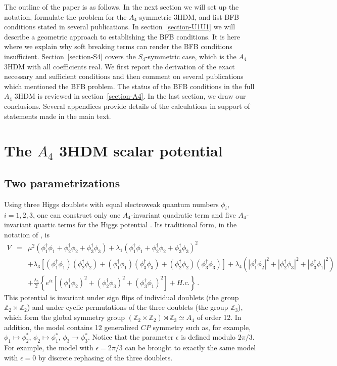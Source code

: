\documentclass[11pt]{article}
\newcommand{\Z}{\mathbb{Z}}
\begin{document}
The outline of the paper is as follows.
In the next section we will set up the notation, formulate the problem for the $A_4$-symmetric 3HDM,
and list BFB conditions stated in several publications.
In section~\ref{section-U1U1} we will describe a geometric approach to establishing the BFB conditions. 
It is here where we explain
why soft breaking terms can render the BFB conditions insufficient.
Section~\ref{section-S4} covers the $S_4$-symmetric case, which is the $A_4$ 3HDM with all coefficients real.
We first report the derivation of the exact necessary and sufficient conditions 
and then comment on several publications which mentioned the BFB problem.
The status of the BFB conditions in the full $A_4$ 3HDM is reviewed in section~\ref{section-A4}. 
In the last section, we draw our conclusions.
Several appendices provide details of the calculations in support of statements made in the main text.

\section{The $A_4$ 3HDM scalar potential}

\subsection{Two parametrizations}

Using three Higgs doublets with equal electroweak quantum numbers $\phi_i$, $i = 1, 2, 3$, 
one can construct only one $A_4$-invariant quadratic term and five $A_4$-invariant quartic terms for the Higgs potential
\cite{Ma:2001dn,Ishimori:2010au,Ivanov:2012ry,Ivanov:2012fp}. 
Its traditional form, in the notation of \cite{Toorop:2010ex}, is
\begin{eqnarray}
V &=& \mu^2(\phi_1^\dagger\phi_1 + \phi_2^\dagger\phi_2 + \phi_3^\dagger\phi_3) + 
\lambda_{1}(\phi_1^\dagger\phi_1 + \phi_2^\dagger\phi_2 + \phi_3^\dagger\phi_3)^2 \nonumber\\[2mm]
&& + \lambda_{3}\left[(\phi_1^\dagger\phi_1)(\phi_2^\dagger\phi_2) + (\phi_1^\dagger\phi_1)(\phi_3^\dagger\phi_3) + (\phi_2^\dagger\phi_2)(\phi_3^\dagger\phi_3)\right] + \lambda_{4} (|\phi_1^\dagger\phi_2|^2 + |\phi_2^\dagger\phi_3|^2 + |\phi_3^\dagger\phi_1|^2)\nonumber\\[2mm]
&& + \frac{\lambda_{5} }{2} \left\{e^{i\epsilon}\left[(\phi_1^\dagger\phi_2)^2 + (\phi_2^\dagger\phi_3)^2 + 
(\phi_3^\dagger\phi_1)^2 \right] + H.c.\right\}\,.\label{VA4-1}
\end{eqnarray}
This potential is invariant under sign flips of individual doublets (the group $\Z_2 \times \Z_2$) 
and under cyclic permutations of the three doublets (the group $\Z_3$),
which form the global symmetry group $(\Z_2 \times \Z_2) \rtimes \Z_3 \simeq A_4$ of order 12.
In addition, the model contains 12 generalized $CP$ symmetry such as, for example,
$\phi_1 \mapsto \phi_2^*$, $\phi_2 \mapsto \phi_1^*$, $\phi_3 \to \phi_3^*$. 
Notice that the parameter $\epsilon$ is defined modulo $2\pi/3$. For example,
the model with $\epsilon = 2\pi/3$ can be brought to exactly the same model with $\epsilon = 0$
by discrete rephasing of the three doublets.
\end{document}
